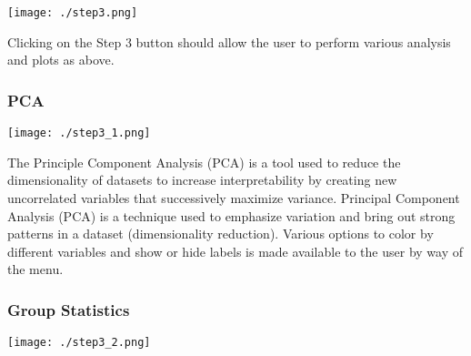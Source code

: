 \documentclass[]{article}
\begin{document}
\texttt{[image: ./step3.png]}

Clicking on the Step 3 button should allow the user to perform various
analysis and plots as above.

\newpage

\hypertarget{pca}{%
\subsubsection{PCA}\label{pca}}

\texttt{[image: ./step3\_1.png]}

The Principle Component Analysis (PCA) is a tool used to reduce the
dimensionality of datasets to increase interpretability by creating new
uncorrelated variables that successively maximize variance. Principal
Component Analysis (PCA) is a technique used to emphasize variation and
bring out strong patterns in a dataset (dimensionality reduction).
Various options to color by different variables and show or hide labels
is made available to the user by way of the menu.

\newpage

\hypertarget{group-statistics}{%
\subsubsection{Group Statistics}\label{group-statistics}}

\texttt{[image: ./step3\_2.png]}
\end{document}
